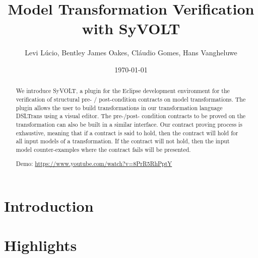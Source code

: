 \documentclass[conference]{IEEEtran}
\begin{document}
\title{Model Transformation Verification with SyVOLT}
\author{Levi L\'{u}cio, Bentley James Oakes, Cl\'{a}udio Gomes, Hans Vangheluwe}

\author{
	} 

\date{\today}


\maketitle 




\begin{abstract}
 
We introduce SyVOLT, a plugin for the Eclipse development environment for the
verification of structural pre- / post-condition contracts on model
transformations. The plugin allows the user to build transformations in our
transformation language DSLTrans using a visual editor. The pre-/post- condition
contracts to be proved on the transformation can also be built in a similar
interface. Our contract proving process is exhaustive, meaning that if a
contract is said to hold, then the contract will hold for all input models of a
transformation. If the contract will not hold, then the input model
counter-examples where the contract fails will be presented.

Demo: \url{https://www.youtube.com/watch?v=8PrR5RhPptY}



\end{abstract}


\section{Introduction}
\label{sec:intro}


\section{Highlights}
\label{sec:highlights}

\end{document}
